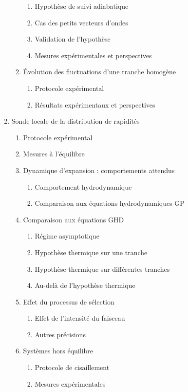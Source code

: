 \documentclass[8pt, landscape]{report}
\begin{document}
\begin{multicols}{3}
\begin{enumerate}
\begin{enumerate}
\begin{enumerate}
            \item Hypothèse de suivi adiabatique
            \item Cas des petits vecteurs d’ondes
            \item Validation de l’hypothèse
            \item Mesures expérimentales et perspectives
        \end{enumerate}
        \item Évolution des fluctuations d’une tranche homogène
        \begin{enumerate}
            \item Protocole expérimental
            \item Résultats expérimentaux et perspectives
        \end{enumerate}
    \end{enumerate}

    \item Sonde locale de la distribution de rapidités
    \begin{enumerate}
        \item Protocole expérimental
        \item Mesures à l’équilibre
        \item Dynamique d’expansion : comportements attendus
        \begin{enumerate}
            \item Comportement hydrodynamique
            \item Comparaison aux équations hydrodynamiques GP
        \end{enumerate}
        \item Comparaison aux équations GHD
        \begin{enumerate}
            \item Régime asymptotique
            \item Hypothèse thermique sur une tranche
            \item Hypothèse thermique sur différentes tranches
            \item Au-delà de l’hypothèse thermique
        \end{enumerate}
        \item Effet du processus de sélection
        \begin{enumerate}
            \item Effet de l’intensité du faisceau
            \item Autres précisions
        \end{enumerate}
        \item Systèmes hors équilibre
        \begin{enumerate}
            \item Protocole de cisaillement
            \item Mesures expérimentales
        \end{enumerate}
    \end{enumerate}
\end{enumerate}

\end{multicols}
\end{document}
